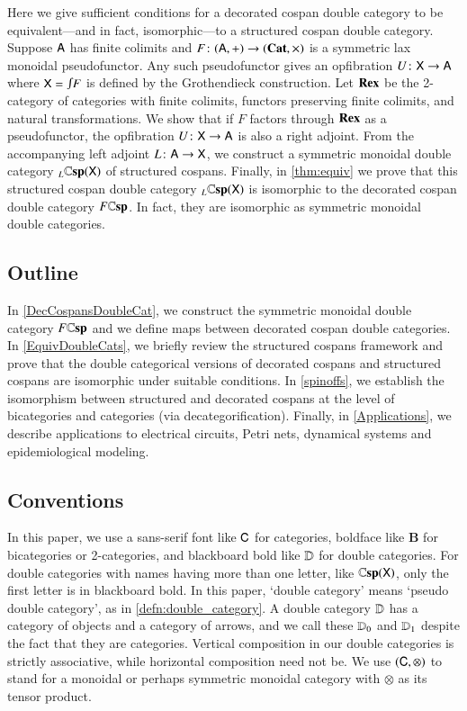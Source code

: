 \documentclass[reqno]{amsart}
\begin{document}
Here we give sufficient conditions for a decorated cospan double category to be equivalent---and in fact, isomorphic---to a structured cospan double category.  Suppose $\mathsf{A}$ has finite colimits and $F \colon (\mathsf{A} , +) \to (\mathbf{Cat}, \times)$ is a symmetric lax monoidal pseudofunctor.   Any such pseudofunctor gives an opfibration $U \colon \mathsf{X} \to \mathsf{A}$ where $\X = \inta F$ is defined by the Grothendieck construction.  Let $\mathbf{Rex}$ be the 2-category of categories with finite colimits, functors preserving finite colimits, and natural transformations.  We show that if $F$ factors through $\mathbf{Rex}$ as a pseudofunctor, the opfibration $U \colon \mathsf{X} \to \mathsf{A}$ is also a right adjoint.  From the accompanying left adjoint $L \colon \mathsf{A} \to \mathsf{X}$, we  construct a symmetric monoidal double category ${}_L \mathbf{\mathbb Csp}(\mathsf{X})$ of structured cospans.  Finally, in \cref{thm:equiv} we prove that this structured cospan double category ${}_L \mathbf{\mathbb Csp}(\mathsf{X})$ is isomorphic to the decorated cospan double category $F \mathbf{\mathbb Csp}$.   In fact, they are isomorphic as symmetric monoidal double categories.

\subsection*{Outline}

In \cref{DecCospansDoubleCat}, we construct the symmetric monoidal double category $F\mathbf{\mathbb Csp}$ and we define maps between decorated cospan double categories. In \cref{EquivDoubleCats}, we briefly review the structured cospans framework and prove that the double categorical versions of decorated cospans and structured cospans are isomorphic under suitable conditions. In \cref{spinoffs}, we establish the isomorphism between structured and decorated cospans at the level of bicategories and categories (via decategorification).
Finally, in \cref{Applications}, we describe applications to electrical circuits, Petri nets, dynamical systems and epidemiological modeling.

\subsection*{Conventions}

In this paper, we use a sans-serif font like $\mathsf{C}$ for categories, boldface like $\mathbf{B}$ for bicategories or 2-categories, and blackboard bold like $\mathbf{\mathbb D}$ for double categories. For double categories with names having more than one letter, like $\mathbf{\mathbb Csp}(\mathsf{X})$, only the first letter is in blackboard bold. In this paper, `double category' means `pseudo double category', as in \cref{defn:double_category}. A double category $\mathbf{\mathbb D}$ has a category of objects and a category of arrows, and we call these $\mathbf{\mathbb D}_0$ and $\mathbf{\mathbb D}_1$ despite the fact that they are categories. Vertical composition in our double categories is strictly associative, while horizontal composition need not be.  We use $(\mathsf{C},\otimes)$ to stand for a monoidal or perhaps symmetric monoidal category with $\otimes$ as its tensor product.
\end{document}
